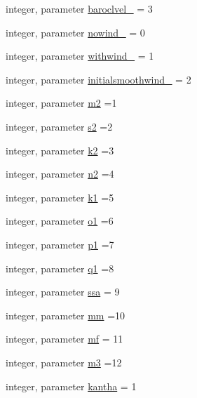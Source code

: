 \begin{DoxyCompactItemize}
integer, parameter \mbox{\hyperlink{namespacemodulehydrodynamic_a3537e1baf7f7e53403105b6b87782666}{baroclvel\+\_\+}} = 3
\item 
integer, parameter \mbox{\hyperlink{namespacemodulehydrodynamic_a248280a5bc3da1d659964d81eb43acee}{nowind\+\_\+}} = 0
\item 
integer, parameter \mbox{\hyperlink{namespacemodulehydrodynamic_a628900d53c3dc0e8656ea6a73ab48369}{withwind\+\_\+}} = 1
\item 
integer, parameter \mbox{\hyperlink{namespacemodulehydrodynamic_a43bf77c32807959996e9d30b8054ccfb}{initialsmoothwind\+\_\+}} = 2
\item 
integer, parameter \mbox{\hyperlink{namespacemodulehydrodynamic_aec21ace8f453043ef4fa34993ebc1805}{m2}} =1
\item 
integer, parameter \mbox{\hyperlink{namespacemodulehydrodynamic_aab740b482f765990a3baedfcdd5c7010}{s2}} =2
\item 
integer, parameter \mbox{\hyperlink{namespacemodulehydrodynamic_a6a549f15a585bad1d81626be37e5a2ee}{k2}} =3
\item 
integer, parameter \mbox{\hyperlink{namespacemodulehydrodynamic_ad52f8d0ca42bda8666eb541a80a51811}{n2}} =4
\item 
integer, parameter \mbox{\hyperlink{namespacemodulehydrodynamic_a8d9b473a6e3cc46ce774fb7f2da43a3c}{k1}} =5
\item 
integer, parameter \mbox{\hyperlink{namespacemodulehydrodynamic_a9fde36bccaa577eb6b1066809bde6cba}{o1}} =6
\item 
integer, parameter \mbox{\hyperlink{namespacemodulehydrodynamic_a1ec23a4af80aafae4e087f9b5e363ef8}{p1}} =7
\item 
integer, parameter \mbox{\hyperlink{namespacemodulehydrodynamic_a374f80ca0e210e3d7443cae0d41863e4}{q1}} =8
\item 
integer, parameter \mbox{\hyperlink{namespacemodulehydrodynamic_a71be04b6d80f12710d26ec5aaacf1b1e}{ssa}} = 9
\item 
integer, parameter \mbox{\hyperlink{namespacemodulehydrodynamic_aa749f16ba28072624f0bf31e67115191}{mm}} =10
\item 
integer, parameter \mbox{\hyperlink{namespacemodulehydrodynamic_a14a180093abeed1a30ddebab114060f6}{mf}} = 11
\item 
integer, parameter \mbox{\hyperlink{namespacemodulehydrodynamic_aa0588e2ae1eb1f5acf28a2925399061c}{m3}} =12
\item 
integer, parameter \mbox{\hyperlink{namespacemodulehydrodynamic_a172edede8072ba59ab0880ae9ce4b128}{kantha}} = 1

\end{DoxyCompactItemize}
